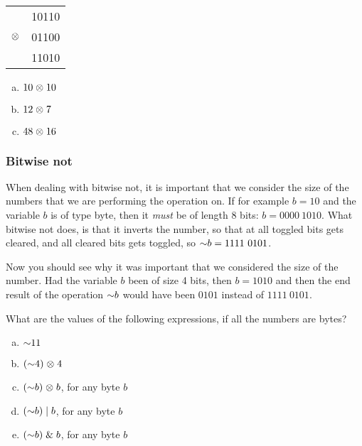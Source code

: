 \begin{center}
  \begin{tabular}{lr}
    & 10110  \\
    $\mathrel{\otimes}$ & 01100 \\
    \hline
    & 11010 \\
  \end{tabular}
\end{center}

\begin{Exercise}[label={bitxor}]
  \begin{enumerate}[(a)]
  \item $10 \mathrel{\otimes} 10$
  \item $12 \mathrel{\otimes} 7$
  \item $48 \mathrel{\otimes} 16$
  \end{enumerate}
\end{Exercise}

\subsubsection{Bitwise not}

When dealing with bitwise not, it is important that we consider the
size of the numbers that we are performing the operation on. If for
example $b=10$ and the variable $b$ is of type byte, then it
\textit{must} be of length 8 bits: $b=0000\ 1010$. What bitwise not
does, is that it inverts the number, so that at all toggled bits gets
cleared, and all cleared bits gets toggled, so $\mathord{\sim} b = 1111\
0101$.

Now you should see why it was important that we considered the size of
the number. Had the variable $b$ been of size 4 bits, then $b = 1010$
and then the end result of the operation $\mathord{\sim} b$ would have been
$0101$ instead of $1111\ 0101$.

\begin{Exercise}[label={bitnot}]
  What are the values of the following expressions, if all the numbers
  are bytes?

  \begin{enumerate}[(a)]
  \item $\mathord{\sim} 11$
  \item $(\mathord{\sim} 4) \mathrel{\otimes} 4$
  \item $(\mathord{\sim} b) \mathrel{\otimes} b$, for any byte $b$
  \item $(\mathord{\sim} b) \mathrel{|} b$, for any byte $b$
  \item $(\mathord{\sim} b) \mathrel{\&} b$, for any byte $b$
  \end{enumerate}

\end{Exercise}

